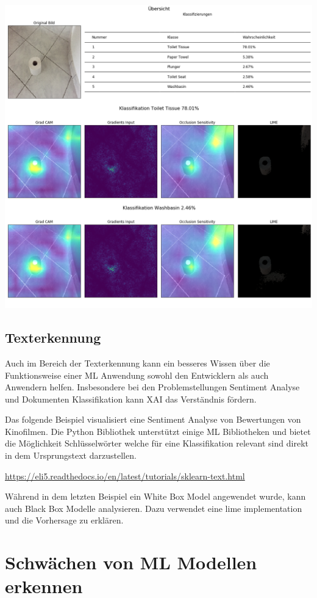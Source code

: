 \documentclass[
  12pt, %
  a4paper, %
  oneside, %
  openany, 
  numbers=noenddot, %
  BCOR=5mm, %
  parskip=half*, %
  thesis, %
]{bfhbook}
\begin{document}
\includegraphics[width=\textwidth]{Bilder/Toilett-Tissue-Classification.png}

\section{Texterkennung}
Auch im Bereich der Texterkennung kann ein besseres Wissen über die Funktionsweise einer \Gls{ML} Anwendung sowohl den Entwicklern als auch Anwendern helfen. Insbesondere bei den Problemstellungen Sentiment Analyse und Dokumenten Klassifikation kann \Gls{XAI} das Verständnis fördern.

Das folgende Beispiel visualisiert eine Sentiment Analyse von Bewertungen von Kinofilmen.
Die Python Bibliothek \cite{ELI5} unterstützt einige \gls{ML} Bibliotheken und bietet die Möglichkeit Schlüsselwörter welche für eine Klassifikation relevant sind direkt in dem Ursprungstext darzustellen.

\url{https://eli5.readthedocs.io/en/latest/tutorials/sklearn-text.html}

Während in dem letzten Beispiel ein White Box Model angewendet wurde, kann \cite{ELI5} auch Black Box Modelle analysieren. Dazu verwendet \cite{ELI5} eine \Gls{lime} implementation und die Vorhersage zu erklären.

\chapter{Schwächen von ML Modellen erkennen}
\end{document}
